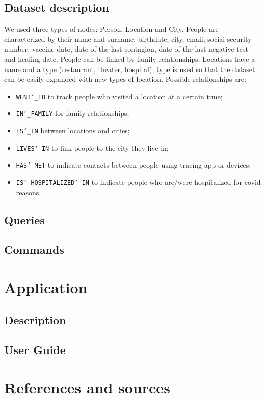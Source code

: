 \documentclass[12pt, a4paper]{article}
\begin{document}
\blindtext

\subsection{Dataset description}

We used three types of nodes: Person, Location and City. 
People are characterized by their name and surname, birthdate, city, email, social security number, vaccine date, date of the last contagion, date of the last negative test and healing date. People can be linked by family relationships.
Locations have a name and a type (restaurant, theater, hospital); type is used so that the dataset can be easily expanded with new types of location.
Possible relationships are: 
\begin{itemize}
	\item \texttt{WENT\char`_TO} to track people who visited a location at a certain time;
	\item \texttt{IN\char`_FAMILY} for family relationships;
	\item \texttt{IS\char`_IN} between locations and cities;
	\item \texttt{LIVES\char`_IN} to link people to the city they live in;
	\item \texttt{HAS\char`_MET} to indicate contacts between people using tracing app or devices;
	\item \texttt{IS\char`_HOSPITALIZED\char`_IN} to indicate people who are/were hospitalized for covid reasons.
\end{itemize}

\subsection{Queries}

\blindtext

\subsection{Commands}

\blindtext

\clearpage

\section{Application}

\subsection{Description}

\blindtext

\subsection{User Guide}

\blindtext

\clearpage

\section{References and sources}

\blindtext

\clearpage
\end{document}

